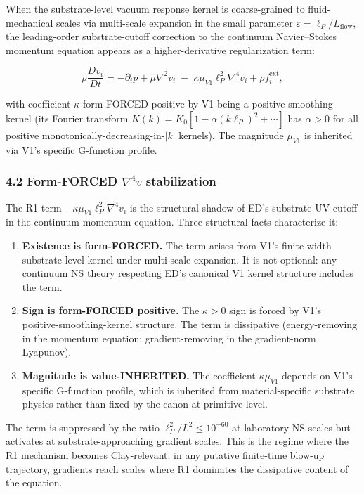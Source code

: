 \documentclass[
  11pt,a4paper]{article}
\begin{document}
When the substrate-level vacuum response kernel is coarse-grained to
fluid-mechanical scales via multi-scale expansion in the small parameter
\(\varepsilon = \ell_P / L_\mathrm{flow}\), the leading-order
substrate-cutoff correction to the continuum Navier--Stokes momentum
equation appears as a higher-derivative regularization term:

\[\rho \frac{D v_i}{Dt} = -\partial_i p + \mu \nabla^2 v_i \;-\; \kappa \mu_{V1} \ell_P^2 \nabla^4 v_i + \rho f_i^\mathrm{ext},\]

with coefficient \(\kappa\) form-FORCED positive by V1 being a positive
smoothing kernel (its Fourier transform
\(\hat K(k) = K_0[1 - \alpha (k\ell_P)^2 + \cdots]\) has \(\alpha > 0\)
for all positive monotonically-decreasing-in-\(|k|\) kernels). The
magnitude \(\mu_{V1}\) is inherited via V1's specific G-function
profile.

\subsubsection{\texorpdfstring{4.2 Form-FORCED \(\nabla^4 v\)
stabilization}{4.2 Form-FORCED \textbackslash nabla\^{}4 v stabilization}}\label{form-forced-nabla4-v-stabilization}

The R1 term \(-\kappa \mu_{V1} \ell_P^2 \nabla^4 v_i\) is the structural
shadow of ED's substrate UV cutoff in the continuum momentum equation.
Three structural facts characterize it:

\begin{enumerate}
\def\labelenumi{\arabic{enumi}.}
\item
  \textbf{Existence is form-FORCED.} The term arises from V1's
  finite-width substrate-level kernel under multi-scale expansion. It is
  not optional: any continuum NS theory respecting ED's canonical V1
  kernel structure includes the term.
\item
  \textbf{Sign is form-FORCED positive.} The \(\kappa > 0\) sign is
  forced by V1's positive-smoothing-kernel structure. The term is
  dissipative (energy-removing in the momentum equation;
  gradient-removing in the gradient-norm Lyapunov).
\item
  \textbf{Magnitude is value-INHERITED.} The coefficient
  \(\kappa \mu_{V1}\) depends on V1's specific G-function profile, which
  is inherited from material-specific substrate physics rather than
  fixed by the canon at primitive level.
\end{enumerate}

The term is suppressed by the ratio \(\ell_P^2 / L^2 \le 10^{-60}\) at
laboratory NS scales but activates at substrate-approaching gradient
scales. This is the regime where the R1 mechanism becomes Clay-relevant:
in any putative finite-time blow-up trajectory, gradients reach scales
where R1 dominates the dissipative content of the equation.
\end{document}
